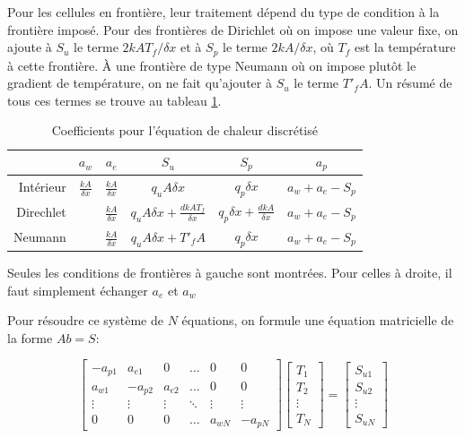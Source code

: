\documentclass[12pt]{article}
\begin{document}
Pour les cellules en frontière, leur traitement dépend du type de condition à 
la frontière imposé. Pour des frontières de Dirichlet où on impose une valeur
fixe, on ajoute à $S_u$ le terme $2kAT_f/\delta x$ et à $S_p$ le terme
$2kA/\delta x$, où $T_f$ est la température à cette frontière. À une frontière
de type Neumann où on impose plutôt le gradient de température, on ne fait
qu'ajouter à $S_u$ le terme $T'_fA$. Un résumé de tous ces termes se trouve au
tableau \ref{tab:coeffs}.

\begin{table}
	\centering
	\begin{threeparttable}
	\caption{Coefficients pour l'équation de chaleur discrétisé}
	\label{tab:coeffs}
	\begin{tabular}{@{}rccccc@{}}
		\toprule
		& $a_w$ & $a_e$ & $S_u$ & $S_p$ & $a_p$ \\\midrule
		Intérieur & $\frac{kA}{\delta x}$ & $\frac{kA}{\delta x}$ & $q_uA\delta x$ & $q_p \delta x$ & $a_w + a_e - S_p$ \\
		Direchlet &  & $\frac{kA}{\delta x}$ & $q_uA\delta x + \frac{dkAT_f}{\delta x} $ 
			  & $q_p \delta x + \frac{dkA}{\delta x}$ & $a_w + a_e - S_p$ \\
		Neumann &  & $\frac{kA}{\delta x}$ & $q_uA\delta x + T'_fA$ & $q_p \delta x$ & $a_w + a_e - S_p$ \\\bottomrule
	\end{tabular}
	\begin{tablenotes}
		\item\textdagger Seules les conditions de frontières à gauche sont
		montrées. Pour celles à droite, il faut simplement échanger
		$a_e$ et $a_w$
	\end{tablenotes}
	\end{threeparttable}
\end{table}

Pour résoudre ce système de $N$ équations, on formule une équation matricielle de
la forme $Ab = S$:

\begin{equation}
	\begin{bmatrix}
		-a_{p1} & a_{e1} & 0 & \dots & 0 & 0 \\
		a_{w1} & - a_{p2} & a_{e2} & \dots & 0 & 0 \\
		\vdots & \vdots & \vdots & \ddots & \vdots & \vdots \\
		0 & 0 & 0 & \dots & a_{wN} & -a_{pN}
	\end{bmatrix}
	\begin{bmatrix}
		T_1 \\
		T_2 \\
		\vdots \\
		T_N 
	\end{bmatrix}
	=
	\begin{bmatrix}
		S_{u1} \\
		S_{u2} \\
		\vdots \\
		S_{uN} 
	\end{bmatrix}
\end{equation}
\end{document}
